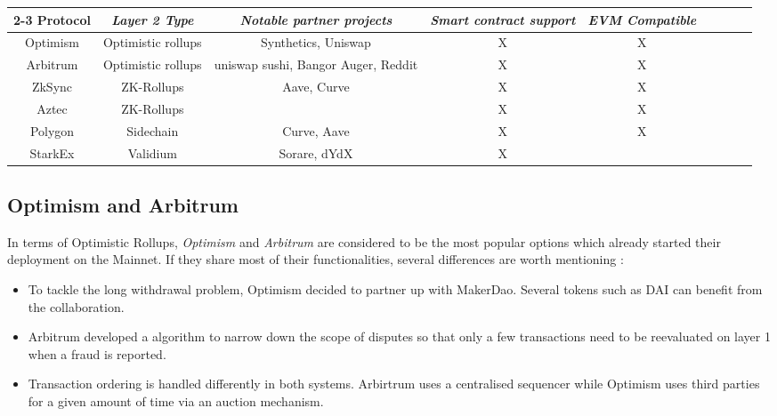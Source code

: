 \begin{table*}[htbp]
\caption{Comparison of Layer 2 Protocols}
\begin{center}
\begin{tabular}{|c|c|c|c|c|c|c|c|c}
\hline
\cline{2-3} 
  \textbf{Protocol} 
& \textbf{\textit{Layer 2 Type}}
& \textbf{\textit{Notable partner projects}}
& \textbf{\textit{Smart contract support}} 
& \textbf{\textit{EVM Compatible}} \\
\hline
Optimism & Optimistic rollups  & Synthetics, Uniswap                 &X & X\\
Arbitrum & Optimistic rollups  & uniswap sushi, Bangor Auger, Reddit &X & X\\
ZkSync   & ZK-Rollups          & Aave, Curve & X & X\\
Aztec    & ZK-Rollups          &  & X & X\\
Polygon    & Sidechain       & Curve, Aave & X & X\\
StarkEx    & Validium       & Sorare, dYdX & X &  \\
\hline
\end{tabular}
\label{tab:comparison:layer2}
\end{center}
\end{table*}



\subsection{Optimism and Arbitrum}

In terms of Optimistic Rollups, \textit{Optimism} \cite{OptimismEthereumLower} and \textit{Arbitrum} \cite{noauthor_arbitrum_nodate} are considered to be the most popular options which already started their deployment on the Mainnet. If they share most of their functionalities, several differences are worth mentioning :
\begin{itemize}
    \item To tackle the long withdrawal problem, Optimism decided to partner up with MakerDao. Several tokens such as DAI can benefit from the collaboration. 
    \item Arbitrum developed a algorithm to narrow down the scope of disputes so that only a few transactions need to be reevaluated on layer 1 when a fraud is reported.
    \item Transaction ordering is handled differently in both systems. Arbirtrum uses a centralised sequencer while Optimism uses third parties for a given amount of time via an auction mechanism.
\end{itemize}

